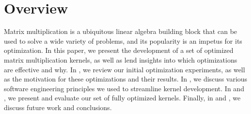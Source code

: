 
\section{Overview}
Matrix multiplication is a ubiquitous linear algebra building block that can be
used to solve a wide variety of problems, and its popularity is an impetus for
its optimization. In this paper, we present the development of a set of
optimized matrix multiplication kernels, as well as lend insights into which
optimizations are effective and why. In , we review our initial
optimization experiments, as well as the motivation for these optimizations and
their results. In , we discuss various software engineering
principles we used to streamline kernel development. In  and
, we present and evaluate our set of fully optimized kernels.
Finally, in  and , we discuss future work and
conclusions.
